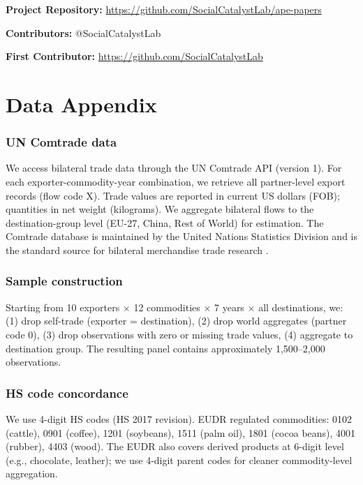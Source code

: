 \documentclass[12pt]{article}
\begin{document}
\noindent\textbf{Project Repository:} \url{https://github.com/SocialCatalystLab/ape-papers}

\noindent\textbf{Contributors:} @SocialCatalystLab

\noindent\textbf{First Contributor:} \url{https://github.com/SocialCatalystLab}

\label{apep_main_text_end}
\newpage


\newpage
\appendix

\section{Data Appendix}

\subsubsection*{UN Comtrade data} We access bilateral trade data through the UN Comtrade API (version 1). For each exporter-commodity-year combination, we retrieve all partner-level export records (flow code X). Trade values are reported in current US dollars (FOB); quantities in net weight (kilograms). We aggregate bilateral flows to the destination-group level (EU-27, China, Rest of World) for estimation. The Comtrade database is maintained by the United Nations Statistics Division and is the standard source for bilateral merchandise trade research \citep{Feenstra2005}.

\subsubsection*{Sample construction} Starting from 10 exporters $\times$ 12 commodities $\times$ 7 years $\times$ all destinations, we: (1) drop self-trade (exporter = destination), (2) drop world aggregates (partner code 0), (3) drop observations with zero or missing trade values, (4) aggregate to destination group. The resulting panel contains approximately 1,500--2,000 observations.

\subsubsection*{HS code concordance} We use 4-digit HS codes (HS 2017 revision). EUDR regulated commodities: 0102 (cattle), 0901 (coffee), 1201 (soybeans), 1511 (palm oil), 1801 (cocoa beans), 4001 (rubber), 4403 (wood). The EUDR also covers derived products at 6-digit level (e.g., chocolate, leather); we use 4-digit parent codes for cleaner commodity-level aggregation.
\end{document}
